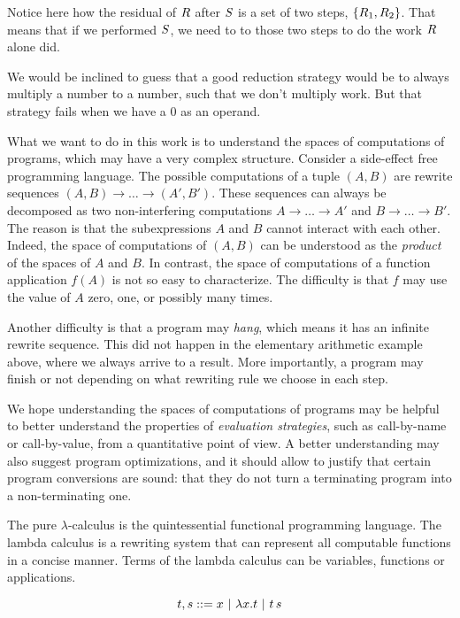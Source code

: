 Notice here how the residual of $R$ after $S$ is a set of two steps, $\{R_1, R_2\}$.
That means that if we performed $S$, we need to to those two steps to do the work $R$ alone did.

We would be inclined to guess that a good reduction strategy would be to always multiply
a number to a number, such that we don't multiply work. But that strategy fails when we have a 0 as an operand.

\bigskip


What we want to do in this work is to understand the spaces of computations of programs,
which may have a very complex structure.
Consider a side-effect free programming language.
The possible computations of a tuple $(A,B)$
are rewrite sequences $(A,B) \to \hdots \to (A',B')$.
These sequences can always be decomposed as two non-interfering computations
$A \to \hdots \to A'$ and $B \to \hdots \to B'$.
The reason is that the subexpressions $A$ and $B$ cannot interact with each other.
Indeed, the space of computations of $(A,B)$ can be understood as
the {\em product} of the spaces of $A$ and $B$.
In contrast, the space of computations of a function application $f(A)$ is not so easy
to characterize. The difficulty is that $f$ may use the value of $A$ zero, one, or
possibly many times.

Another difficulty is that a program may \emph{hang}, which means it has an infinite rewrite sequence.
This did not happen in the elementary arithmetic example above, where we always arrive to a result.
More importantly, a program may finish or not depending on what rewriting rule we choose in each step.

We hope understanding the spaces of computations of programs
may be helpful to better understand the properties of {\em evaluation strategies},
such as call-by-name or call-by-value,
from a quantitative point of view.
A better understanding may also suggest program optimizations,
and it should allow to justify that certain program conversions are sound:
\eg that they do not turn a terminating program into a non-terminating one.




The pure $\lambda$-calculus is the quintessential functional programming language.
The lambda calculus is a rewriting system that can represent all computable functions in a concise manner.
Terms of the lambda calculus can be variables, functions or applications.

\[
  \tm, \tmtwo ::= \var \ | \ \lam{\var}{\tm} \ | \ \tm\, \tmtwo
\]

